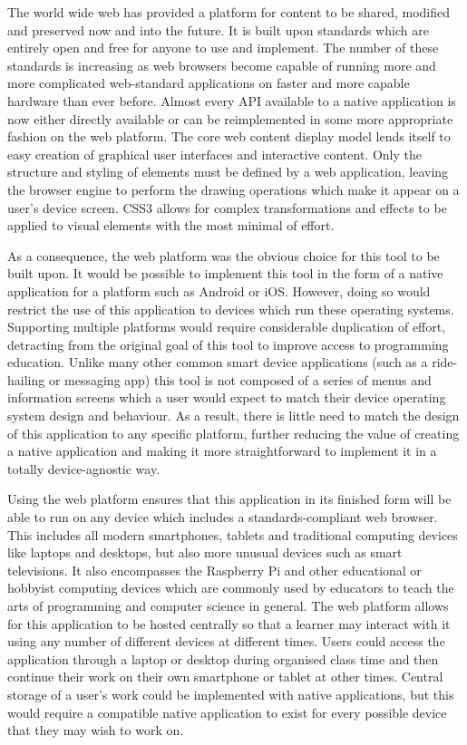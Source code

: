 The world wide web has provided a platform for content to be shared, modified and preserved now and into the future. It is built upon standards which are entirely open and free for anyone to use and implement. The number of these standards is increasing as web browsers become capable of running more and more complicated web-standard applications on faster and more capable hardware than ever before. Almost every API available to a native application is now either directly available or can be reimplemented in some more appropriate fashion on the web platform. The core web content display model lends itself to easy creation of graphical user interfaces and interactive content. Only the structure and styling of elements must be defined by a web application, leaving the browser engine to perform the drawing operations which make it appear on a user's device screen. CSS3 allows for complex transformations and effects to be applied to visual elements with the most minimal of effort.

As a consequence, the web platform was the obvious choice for this tool to be built upon. It would be possible to implement this tool in the form of a native application for a platform such as Android or iOS. However, doing so would restrict the use of this application to devices which run these operating systems. Supporting multiple platforms would require considerable duplication of effort, detracting from the original goal of this tool to improve access to programming education. Unlike many other common smart device applications (such as a ride-hailing or messaging app) this tool is not composed of a series of menus and information screens which a user would expect to match their device operating system design and behaviour. As a result, there is little need to match the design of this application to any specific platform, further reducing the value of creating a native application and making it more straightforward to implement it in a totally device-agnostic way.

Using the web platform ensures that this application in its finished form will be able to run on any device which includes a standards-compliant web browser. This includes all modern smartphones, tablets and traditional computing devices like laptops and desktops, but also more unusual devices such as smart televisions. It also encompasses the Raspberry Pi and other educational or hobbyist computing devices which are commonly used by educators to teach the arts of programming and computer science in general. The web platform allows for this application to be hosted centrally so that a learner may interact with it using any number of different devices at different times. Users could access the application through a laptop or desktop during organised class time and then continue their work on their own smartphone or tablet at other times. Central storage of a user's work could be implemented with native applications, but this would require a compatible native application to exist for every possible device that they may wish to work on.